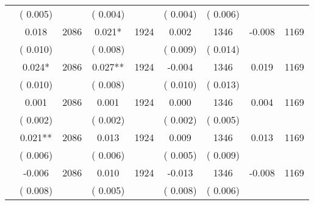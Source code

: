 \begin{tabular}{l*{8}{c}}
                       &       (       0.005)            &                               &       (       0.004)            &                               &       (       0.004)            &       (       0.006) &                  \\
        &              0.018      &       2086       &              0.021*      &       1924       &              0.002      &       1346  &       -0.008 &       1169       \\
                       &       (       0.010)            &                               &       (       0.008)            &                               &       (       0.009)            &       (       0.014) &                  \\
        &              0.024*      &       2086       &              0.027**      &       1924       &             -0.004      &       1346  &        0.019 &       1169       \\
                       &       (       0.010)            &                               &       (       0.008)            &                               &       (       0.010)            &       (       0.013) &                  \\
        &              0.001      &       2086       &              0.001      &       1924       &              0.000      &       1346  &        0.004 &       1169       \\
                       &       (       0.002)            &                               &       (       0.002)            &                               &       (       0.002)            &       (       0.005) &                  \\
        &              0.021**      &       2086       &              0.013      &       1924       &              0.009      &       1346  &        0.013 &       1169       \\
                       &       (       0.006)            &                               &       (       0.006)            &                               &       (       0.005)            &       (       0.009) &                  \\
        &             -0.006      &       2086       &              0.010      &       1924       &             -0.013      &       1346  &       -0.008 &       1169       \\
                       &       (       0.008)            &                               &       (       0.005)            &                               &       (       0.008)            &       (       0.006) &                  \\

\end{tabular}
